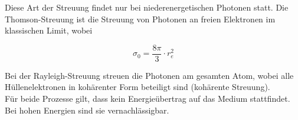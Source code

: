 Diese Art der Streuung findet nur bei niederenergetischen Photonen statt. Die Thomson-Streuung
ist die Streuung von Photonen an freien Elektronen im klassischen Limit, wobei

\[ \sigma_0= \frac{8\pi}{3}\cdot r_e^2 \]

Bei der Rayleigh-Streuung streuen die Photonen am gesamten Atom, wobei alle Hüllenelektronen in
kohärenter Form beteiligt sind (kohärente Streuung).
\\
Für beide Prozesse gilt, dass kein Energieübertrag auf das Medium stattfindet. Bei hohen Energien
sind sie vernachlässigbar.
